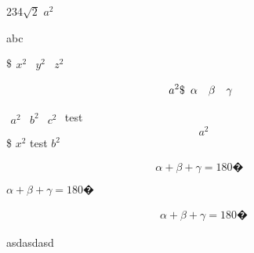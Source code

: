 \documentclass{article}
\begin{document}
234$ \sqrt{2}$  $a^2$

abc

$  \$      %
\begin{array}{ccc}
x^2 & y^2 & z^2
\end{array}
$

\begin{equation}
  a^2 \\\\\$
 \begin{array}{ccc}
  \alpha & \beta & \gamma
 \end{array}
\end{equation}

$\begin{array}{ccc}
a^2 & b^2 & c^2
\end{array}$
test
\[
 a^2
\] \$ $ x^2$
test
\( 
 b^2 %
\)

\begin{displaymath} %
	\alpha + \beta + \gamma = 180� %
\begin{split}
	
\end{split}

\end{displaymath}

\begin{math} %
	\alpha + \beta + \gamma = 180� %
\end{math}

\begin{eqnarray} %
	\alpha + \beta + \gamma = 180� %
\end{eqnarray}

\begin{mathtest} %
	asdasdasd
\end{mathtest}
\end{document}

